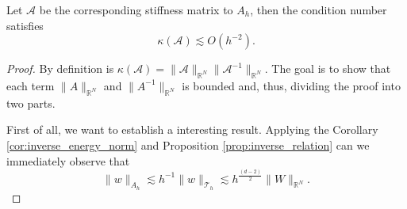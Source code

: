 \begin{theorem}
    Let $\mathcal{A} $ be the corresponding stiffness matrix to $A_{h}$, then the condition number satisfies \[
    \kappa ( \mathcal{A} ) \lesssim O(h^{-2}).
    \]

\end{theorem}
\begin{proof}
    By definition is $\kappa ( \mathcal{A} ) = \| \mathcal{A}  \|_{ \mathbb{R} ^{N} }^{  } \| \mathcal{A}^{-1}  \|_{ \mathbb{R} ^{N} }^{  }$. The goal is to show that each term $\| A \|_{ \mathbb{R} ^{N} }^{  } $   and $\| A^{-1} \|_{\mathbb{R} ^{N}
    }^{  } $ is bounded and, thus, dividing the proof into two parts.

    First of all, we want to establish a interesting result. Applying the Corollary \ref{cor:inverse_energy_norm} and Proposition \ref{prop:inverse_relation} can we immediately observe that
    \begin{equation}
    \label{eq:inverse_equivalence_relation}
    \|w \|_{ A_{h} }^{  } \lesssim h^{-1} \| w \|_{ \mathcal{T} _{h} }^{  } \lesssim h^{\frac{( d-2) }{2} }\| W \|_{\mathbb{R} ^{N}  }^{  }.
    \end{equation}



\end{proof}
